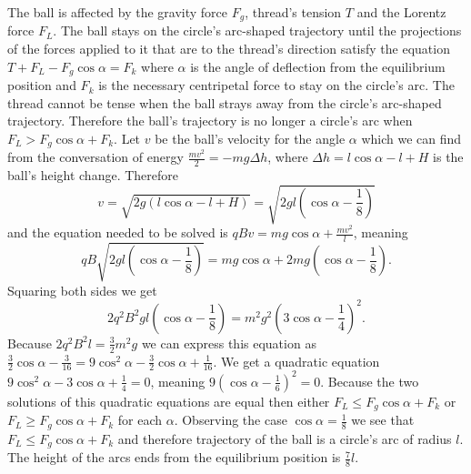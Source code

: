 \documentclass[11pt]{article}
\begin{document}

\solueng
The ball is affected by the gravity force $F_g$, thread’s tension $T$ and the Lorentz force $F_L$. The ball stays on the circle’s arc-shaped trajectory until the projections of the forces applied to it that are to the thread’s direction satisfy the equation $T+F_L-F_g\cos\alpha=F_k$ where $\alpha$ is the angle of deflection from the equilibrium position and $F_k$ is the necessary centripetal force to stay on the circle’s arc. The thread cannot be tense when the ball strays away from the circle’s arc-shaped trajectory. Therefore the ball’s trajectory is no longer a circle’s arc when $F_L>F_g\cos\alpha+F_k$. Let $v$ be the ball’s velocity for the angle $\alpha$ which we can find from the conversation of energy $\frac{mv^2}{2}=-mg\Delta h$, where $\Delta h=l\cos\alpha-l+H$ is the ball’s height change. Therefore 
\[
v=\sqrt{2g\left(l\cos\alpha-l+H\right)}=\sqrt{2gl\left(\cos\alpha-\frac{1}{8}\right)}
\]
and the equation needed to be solved is $qBv=mg\cos\alpha+\frac{mv^2}{l}$, meaning
\[
qB\sqrt{2gl\left(\cos\alpha-\frac{1}{8}\right)}=mg\cos\alpha+2mg\left(\cos\alpha-\frac{1}{8}\right).
\]
Squaring both sides we get
\[
2q^2B^2gl\left(\cos\alpha-\frac{1}{8}\right)=m^2g^2\left(3\cos\alpha-\frac{1}{4}\right)^2.
\]
Because $2q^2B^2l=\frac{3}{2}m^2g$ we can express this equation as $\frac{3}{2}\cos\alpha-\frac{3}{16}=9\cos^2\alpha-\frac{3}{2}\cos\alpha+\frac{1}{16}$. We get a quadratic equation $9\cos^2\alpha-3\cos\alpha+\frac{1}{4}=0$, meaning $9\left(\cos\alpha-\frac{1}{6}\right)^2=0$. Because the two solutions of this quadratic equations are equal then either $F_L\leq F_g\cos\alpha+F_k$ or $F_L\geq F_g\cos\alpha+F_k$ for each $\alpha$. Observing the case $\cos\alpha=\frac{1}{8}$ we see that $F_L\leq F_g\cos\alpha+F_k$ and therefore trajectory of the ball is a circle’s arc of radius $l$. The height of the arcs ends from the equilibrium position is $\frac{7}{8}l$.
\probend
\bigskip

\end{document}
